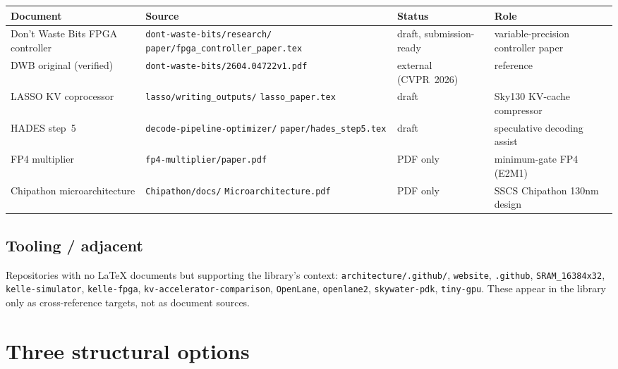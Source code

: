\documentclass[11pt]{article}
\begin{document}
\begin{center}
\renewcommand{\arraystretch}{1.2}
\setlength{\tabcolsep}{4pt}
\begin{tabular}{@{}p{}p{}lp{}@{}}
\toprule
\textbf{Document} & \textbf{Source} & \textbf{Status} & \textbf{Role} \\
\midrule
Don't Waste Bits FPGA controller & \texttt{dont-waste-bits/research/}
                                    \texttt{paper/fpga\_controller\_paper.tex}
  & draft, submission-ready & variable-precision controller paper \\
DWB original (verified)          & \texttt{dont-waste-bits/2604.04722v1.pdf}
  & external (CVPR~2026) & reference \\
LASSO KV coprocessor             & \texttt{lasso/writing\_outputs/}
                                    \texttt{lasso\_paper.tex}
  & draft & Sky130 KV-cache compressor \\
HADES step~5                     & \texttt{decode-pipeline-optimizer/}
                                    \texttt{paper/hades\_step5.tex}
  & draft & speculative decoding assist \\
FP4 multiplier                   & \texttt{fp4-multiplier/paper.pdf}
  & PDF only & minimum-gate FP4 (E2M1) \\
Chipathon microarchitecture      & \texttt{Chipathon/docs/}
                                    \texttt{Microarchitecture.pdf}
  & PDF only & SSCS Chipathon 130nm design \\
\bottomrule
\end{tabular}
\end{center}

\subsection{Tooling / adjacent}

Repositories with no LaTeX documents but supporting the library's
context: \texttt{architecture/.github/}, \texttt{website},
\texttt{.github}, \texttt{SRAM\_16384x32}, \texttt{kelle-simulator},
\texttt{kelle-fpga}, \texttt{kv-accelerator-comparison},
\texttt{OpenLane}, \texttt{openlane2}, \texttt{skywater-pdk},
\texttt{tiny-gpu}. These appear in the library only as cross-reference
targets, not as document sources.

\section{Three structural options}
\end{document}
